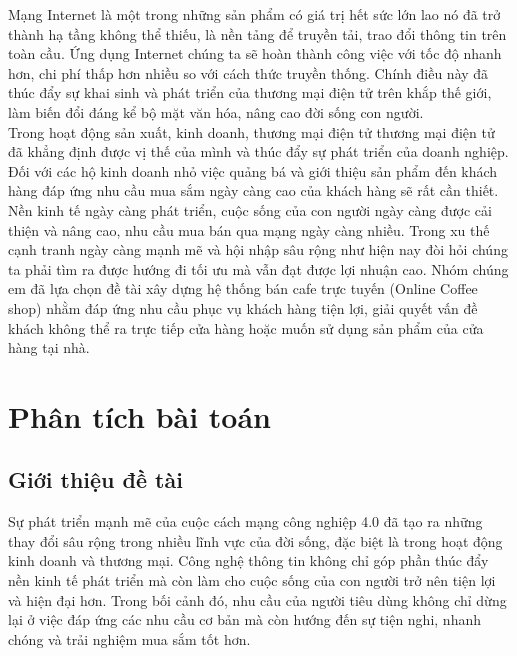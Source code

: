 \documentclass[pt = 12,a4paper]{article}
\begin{document}
\hspace{0.4cm} Mạng Internet là một trong những sản phẩm có giá trị hết sức lớn lao nó đã trở thành hạ tầng không thể thiếu, là nền tảng để truyền tải, trao đổi thông tin trên toàn cầu. Ứng dụng Internet chúng ta sẽ hoàn thành công việc với tốc độ nhanh hơn, chi phí thấp hơn nhiều so với cách thức truyền thống. Chính điều này đã thúc đẩy sự khai sinh và phát triển của thương mại điện tử trên khắp thế giới, làm biến đổi đáng kể bộ mặt văn hóa, nâng cao đời sống con người.\\

\hspace{0.4cm} Trong hoạt động sản xuất, kinh doanh, thương mại điện tử thương mại điện tử đã khẳng định được vị thế của mình và thúc đẩy sự phát triển của doanh nghiệp. Đối với các hộ kinh doanh nhỏ việc quảng bá và giới thiệu sản phẩm đến khách hàng đáp ứng nhu cầu mua sắm ngày càng cao của khách hàng sẽ rất cần thiết. Nền kinh tế ngày càng phát triển, cuộc sống của con người ngày càng được cải thiện và nâng cao, nhu cầu mua bán qua mạng ngày càng nhiều. Trong xu thế cạnh tranh ngày càng mạnh mẽ và hội nhập sâu rộng như hiện nay đòi hỏi chúng ta phải tìm ra được hướng đi tối ưu mà vẫn đạt được lợi nhuận cao. Nhóm chúng em đã lựa chọn đề tài xây dựng hệ thống bán cafe trực tuyến (Online Coffee shop) nhằm đáp ứng nhu cầu phục vụ khách hàng tiện lợi, giải quyết vấn đề khách không thể ra trực tiếp cửa hàng hoặc muốn sử dụng sản phẩm của cửa hàng tại nhà.

\newpage
\section{Phân tích bài toán}
\subsection{Giới thiệu đề tài}

\hspace{0.4cm}Sự phát triển mạnh mẽ của cuộc cách mạng công nghiệp 4.0 đã tạo ra những thay đổi sâu rộng trong nhiều lĩnh vực của đời sống, đặc biệt là trong hoạt động kinh doanh và thương mại. Công nghệ thông tin không chỉ góp phần thúc đẩy nền kinh tế phát triển mà còn làm cho cuộc sống của con người trở nên tiện lợi và hiện đại hơn. Trong bối cảnh đó, nhu cầu của người tiêu dùng không chỉ dừng lại ở việc đáp ứng các nhu cầu cơ bản mà còn hướng đến sự tiện nghi, nhanh chóng và trải nghiệm mua sắm tốt hơn.\\
\end{document}
